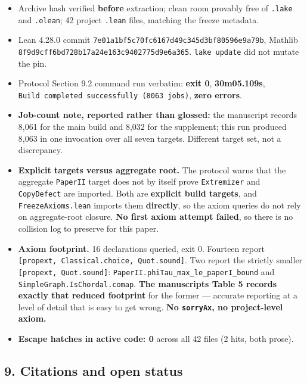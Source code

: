 \documentclass[
  9pt,
  a4paper,
]{article}
\providecommand{\tightlist}{%
  \setlength{\itemsep}{0pt}\setlength{\parskip}{0pt}}
\begin{document}
\begin{itemize}
\tightlist
\item
  Archive hash verified \textbf{before} extraction; clean room provably
  free of \texttt{.lake} and \texttt{.olean}; 42 project \texttt{.lean}
  files, matching the freeze metadata.
\item
  Lean 4.28.0 commit \texttt{7e01a1bf5c70fc6167d49c345d3bf80596e9a79b},
  Mathlib \texttt{8f9d9cff6bd728b17a24e163c9402775d9e6a365}.
  \texttt{lake\ update} did not mutate the pin.
\item
  Protocol Section 9.2 command run verbatim: \textbf{exit 0},
  \textbf{30m05.109s},
  \texttt{Build\ completed\ successfully\ (8063\ jobs)}, \textbf{zero
  errors}.
\item
  \textbf{Job-count note, reported rather than glossed:} the manuscript
  records 8,061 for the main build and 8,032 for the supplement; this
  run produced 8,063 in one invocation over all seven targets. Different
  target set, not a discrepancy.
\item
  \textbf{Explicit targets versus aggregate root.} The protocol warns
  that the aggregate \texttt{PaperII} target does not by itself prove
  \texttt{Extremizer} and \texttt{CopyDefect} are imported. Both are
  \textbf{explicit build targets}, and \texttt{FreezeAxioms.lean}
  imports them \textbf{directly}, so the axiom queries do not rely on
  aggregate-root closure. \textbf{No first axiom attempt failed}, so
  there is no collision log to preserve for this paper.
\item
  \textbf{Axiom footprint.} 16 declarations queried, exit 0. Fourteen
  report \texttt{{[}propext,\ Classical.choice,\ Quot.sound{]}}. Two
  report the strictly smaller \texttt{{[}propext,\ Quot.sound{]}}:
  \texttt{PaperII.phiTau\_max\_le\_paperI\_bound} and
  \texttt{SimpleGraph.IsChordal.comap}. \textbf{The
  manuscript\textquotesingle s Table 5 records exactly that reduced
  footprint} for the former --- accurate reporting at a level of detail
  that is easy to get wrong. \textbf{No \texttt{sorryAx}, no
  project-level axiom.}
\item
  \textbf{Escape hatches in active code: 0} across all 42 files (2 hits,
  both prose).
\end{itemize}

\subsection{9. Citations and open
status}\label{9-citations-and-open-status}
\end{document}
